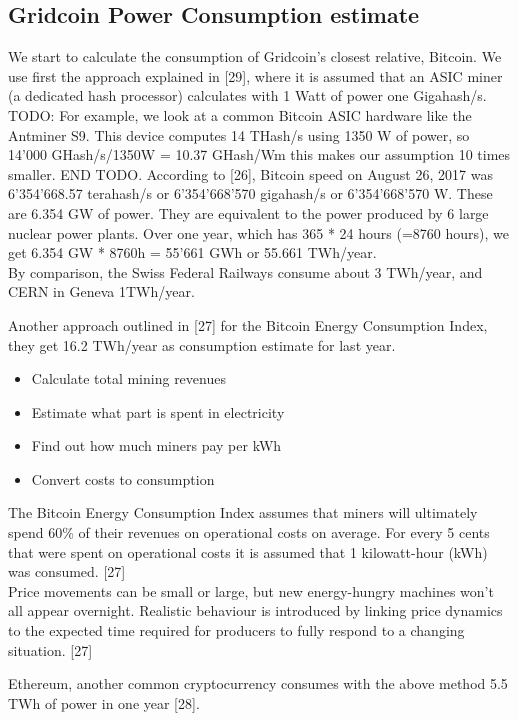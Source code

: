 \subsection{Gridcoin Power Consumption estimate}

We start to calculate the consumption of Gridcoin's closest relative, Bitcoin. 
We use first the approach explained in [29], where it is assumed that an ASIC miner (a dedicated hash processor) calculates with 1 Watt of power one Gigahash/s. TODO: For example, we look at a common Bitcoin ASIC hardware like the Antminer S9. This device computes 14 THash/s using 1350 W of power, so 14'000 GHash/s/1350W = 10.37 GHash/Wm this makes our assumption 10 times smaller. END TODO. According to [26], Bitcoin speed on August 26, 2017 was 6'354'668.57 terahash/s or 6'354'668'570 gigahash/s or 6'354'668'570 W. These are 6.354 GW of power. They are equivalent to the power produced by 6 large nuclear power plants. Over one year, which has 365 * 24 hours (=8760 hours), we get 6.354 GW * 8760h = 55'661 GWh or 55.661 TWh/year.\\ 

By comparison, the Swiss Federal Railways consume about 3 TWh/year, and CERN in Geneva 1TWh/year.

Another approach outlined in [27] for the Bitcoin Energy Consumption Index, they get 16.2 TWh/year as consumption estimate for last year.

\begin{itemize}
	\item Calculate total mining revenues
	\item Estimate what part is spent in electricity
	\item Find out how much miners pay per kWh
	\item Convert costs to consumption
\end{itemize}

The Bitcoin Energy Consumption Index assumes that miners will ultimately spend 60\% of their revenues on operational costs on average. For every 5 cents that were spent on operational costs it is assumed that 1 kilowatt-hour (kWh) was consumed. [27]\\

Price movements can be small or large, but new energy-hungry machines won't all appear overnight. Realistic behaviour is introduced by linking price dynamics to the expected time required for producers to fully respond to a changing situation. [27]

Ethereum, another common cryptocurrency consumes with the above method 5.5 TWh of power in one year [28].\\

